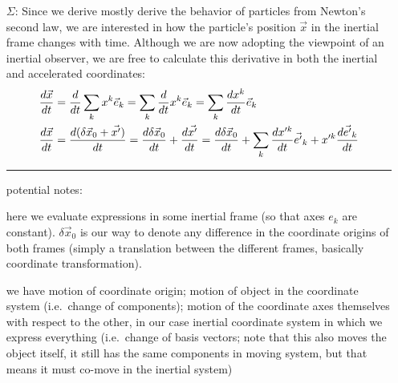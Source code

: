 \documentclass[../class_mech_main.tex]{subfiles}
\begin{document}
\begin{itemize}
	\item[$\Sigma$:] Since we derive mostly derive the behavior of particles from Newton's second law, we are interested in how the particle's position $\vec{x}$ in the inertial frame changes with time. Although we are now adopting the viewpoint of an inertial observer, we are free to calculate this derivative in both the inertial and accelerated coordinates:
	\begin{align}
		\dv{\vec{x}}{t} &= \dv{t} \sum_k x^k \vec{e}_k
		= \sum_k \dv{t} x^k \vec{e}_k
		= \sum_k \dv{x^k}{t} \vec{e}_k
		\label{eq:velocity_from_inert_frame_in_inert_frame}
		\\
		\dv{\vec{x}}{t} &= \dv{(\delta \vec{x}_0 + \vec{x'})}{t}
		= \dv{\delta \vec{x}_0}{t} + \dv{\vec{x'}}{t}
		= \dv{\delta \vec{x}_0}{t} + \sum_k \dv{x'^k}{t} \vec{e'}_k + x'^k \dv{\vec{e'}_k}{t}
		\label{eq:velocity_from_inert_frame_in_accel_frame}
	\end{align}

	\hrule

	potential notes:

	here we evaluate expressions in some inertial frame (so that axes $e_k$ are constant). $\delta \vec{x}_0$ is our way to denote any difference in the coordinate origins of both frames (simply a translation between the different frames, basically coordinate transformation).


	we have motion of coordinate origin; motion of object in the coordinate system (i.e.~change of components); motion of the coordinate axes themselves with respect to the other, in our case inertial coordinate system in which we express everything (i.e.~change of basis vectors; note that this also moves the object itself, it still has the same components in moving system, but that means it must co-move in the inertial system)





\end{itemize}
\end{document}
